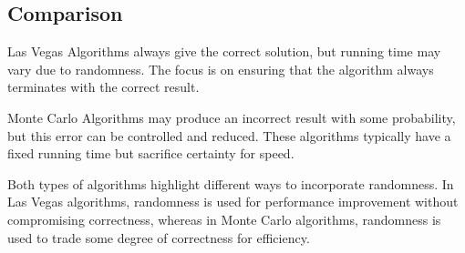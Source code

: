\subsection{Comparison}
Las Vegas Algorithms always give the correct solution, but running time may vary due to randomness. 
The focus is on ensuring that the algorithm always terminates with the correct result.

Monte Carlo Algorithms may produce an incorrect result with some probability, but this error can be controlled and reduced. 
These algorithms typically have a fixed running time but sacrifice certainty for speed.

Both types of algorithms highlight different ways to incorporate randomness. 
In Las Vegas algorithms, randomness is used for performance improvement without compromising correctness, whereas in Monte Carlo algorithms, randomness is used to trade some degree of correctness for efficiency.